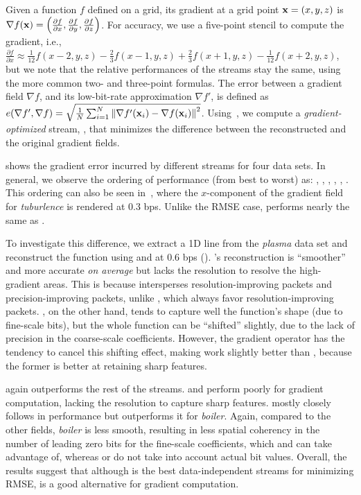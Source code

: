 Given a function $f$ defined on a grid, its gradient at a grid point \mbox{$\x = (x,y,z)$} is
$\nabla f(\x) = \left(\frac{\partial f}{\partial x}, \frac{\partial f}{\partial y}, \frac{\partial
f}{\partial z}\right)$. For accuracy, we use a five-point stencil to compute the gradient, i.e.,
$\frac{\partial f}{\partial x} \approx \frac{1}{12}f(x-2,y,z) - \frac{2}{3}f(x-1,y,z) +
\frac{2}{3}f(x+1,y,z) - \frac{1}{12}f(x+2,y,z)$, but we note that the relative performances of the
streams stay the same, using the more common two- and three-point formulas. The error between a
gradient field $\nabla f$, and its low-bit-rate approximation $\nabla f'$, is defined as
$\err(\nabla f', \nabla f) = \sqrt{\frac{1}{N} \sum_{i=1}^{N}{\norm{\nabla f'(\x_i)-\nabla
f(\x_i)}^2}}$. Using~, we compute a \emph{gradient-optimized} stream, \sgop, that
minimizes the difference between the reconstructed and the original gradient fields.

 shows the gradient error incurred by different streams for four
data sets. In general, we observe the ordering of performance (from best to worst) as: \sgop, \sgsg,
\sbit, \swav, \smag, \slvl. This ordering can also be seen in~,
where the $x$-component of the gradient field for \emph{tuburlence} is rendered at 0.3 bps. Unlike
the RMSE case, \sbit performs nearly the same as \swav.

To investigate this difference, we extract a 1D line from the \emph{plasma} data set and reconstruct
the function using \sbit and \swav at 0.6 bps ().
\swav's reconstruction is ``smoother'' and more accurate \emph{on average} but lacks the resolution
to resolve the high-gradient areas. This is because \swav intersperses resolution-improving packets
and precision-improving packets, unlike \sbit, which always favor resolution-improving packets.
\sbit, on the other hand, tends to capture well the function's shape (due to fine-scale bits), but
the whole function can be ``shifted'' slightly, due to the lack of precision in the coarse-scale
coefficients. However, the gradient operator has the tendency to cancel this shifting effect, making
\sbit work slightly better than \swav, because the former is better at retaining sharp features.

\sgop again outperforms the rest of the streams. \slvl and \smag perform poorly for gradient
computation, lacking the resolution to capture sharp features. \sgsg mostly closely follows \sbit in
performance but outperforms it for \emph{boiler}. Again, compared to the other fields, \emph{boiler}
is less smooth, resulting in less spatial coherency in the number of leading zero bits for the
fine-scale coefficients, which \sgop and \sgsg can take advantage of, whereas \swav or \sbit do not
take into account actual bit values. Overall, the results suggest that although \swav is the best
data-independent streams for minimizing RMSE, \sbit is a good alternative for gradient computation.

